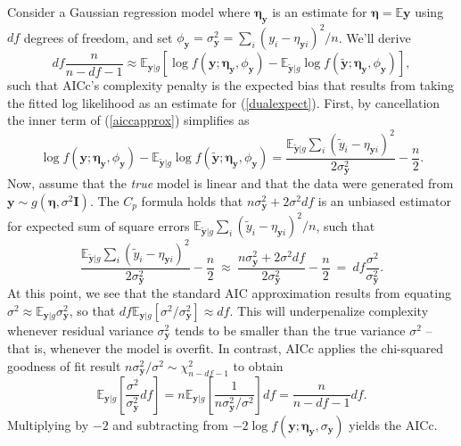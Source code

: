 \documentclass[12pt]{article}
\newcommand{\bs}[1]{\boldsymbol{#1}}
\newcommand{\bm}[1]{\mathbf{#1}}
\newcommand{\ds}[1]{\mathds{#1}}
\begin{document}
Consider a Gaussian regression model where $\bs{\eta}_\bm{y}$ is an estimate
for $\bs{\eta} = \ds{E}\bm{y}$ using $df$ degrees of freedom, and set $\phi_\bm{y} =
\sigma^2_{\bm{y}} = \sum_i (y_i - \eta_{\bm{y}i})^2/n$. We'll derive
\begin{equation}\label{aiccapprox}
df\frac{n}{n-df-1}  \approx \ds{E}_{\bm{y}|g}\left[\log f(\bm{y}; \bs{\eta}_{\bm{y}},\phi_{\bm{y}}) - \ds{E}_{\bm{\tilde y}|g} \log f(\bm{\tilde y}; \bs{\eta}_{\bm{y}},\phi_{\bm{y}})
\right],
\end{equation}
such that AICc's complexity penalty is the expected bias that results from taking the fitted log likelihood as an estimate for (\ref{dualexpect}).  First, by cancellation the inner term of (\ref{aiccapprox}) simplifies as 
\begin{equation}
\log f(\bm{y}; \bs{\eta}_{\bm{y}},\phi_{\bm{y}}) - \ds{E}_{\bm{\tilde y}|g} \log f(\bm{\tilde y}; \bs{\eta}_{\bm{y}},\phi_{\bm{y}}) = 
\frac{\ds{E}_{\bm{\tilde y}|g} \sum_i (\tilde y_i - \eta_{\bm{y}i})^2}{2 \sigma^2_{\bm{y}}} - \frac{n}{2}.
\end{equation}
Now, assume that the {\it true} model is linear and that the data were generated
from $\bm{y}\sim g(\bs{\eta}, \sigma^2\bm{I})$.  The \cite{mallows_comments_1973} $C_p$ formula holds that 
$n\sigma^2_{\bm{y}} + 2 \sigma^2 df$ is an unbiased estimator for  expected 
sum of square errors $\ds{E}_{\bm{\tilde y}|g} \sum_i (\tilde y_i - \eta_{\bm{y}i})^2/n$, such that
\begin{equation}
\frac{\ds{E}_{\bm{\tilde y}|g} \sum_i (\tilde y_i - \eta_{\bm{y}i})^2}{2 \sigma^2_{\bm{y}}} - \frac{n}{2} 
 ~\approx~ \frac{n\sigma^2_{\bm{y}} + 2 \sigma^2 df}{2 \sigma^2_{\bm{y}}} - \frac{n}{2}
 ~=~  df\frac{\sigma^2 }{\sigma^2_{\bm{y}}}.
\end{equation}
At this point, we see that the standard AIC approximation results from equating $\sigma^2 \approx \ds{E}_{\bm{y}|g}\sigma^2_{\bm{y}}$, so that $df\ds{E}_{\bm{y}|g}[\sigma^2/\sigma^2_{\bm{y}}] \approx df$.  This will underpenalize complexity whenever residual variance $\sigma^2_{\bm{y}}$ tends to be smaller than the true variance $\sigma^2$  -- that is, whenever the model is overfit.  In contrast, AICc applies the chi-squared goodness of fit result $
{n\sigma^2_{\bm{y}}/\sigma^2} \sim \chi^2_{n-df-1}
$
to obtain 
\begin{equation}
\ds{E}_{\bm{y}|g}\left[\frac{\sigma^2 }{\sigma^2_{\bm{y}}}df\right]= 
n\ds{E}_{\bm{y}|g}\left[\frac{1}{n\sigma^2_{\bm{y}}/\sigma^2}\right]df = 
\frac{n}{n-df-1}df.
\end{equation}
Multiplying by $-2$ and subtracting from $-2\log f(\bm{y}; \bs{\eta}_{\bm{y}},\sigma_{\bm{y}})$ yields the AICc.
\end{document}
